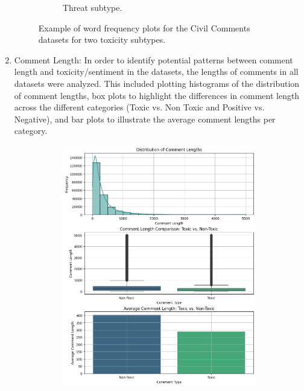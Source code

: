 \documentclass[10pt,a4paper,oneside]{article} %
\begin{document}
\begin{enumerate}
\begin{figure}[h]
\begin{subfigure}{0.5\textwidth}
        \caption{Threat subtype.}
        \label{fig:word_freq_threat_cc}
    \end{subfigure}
    \caption{Example of word frequency plots for the Civil Comments datasets for two toxicity subtypes.}
    \label{fig:word_freq_cc}
    \end{figure}
    \item Comment Length: In order to identify potential patterns between comment length and toxicity/sentiment in the datasets, the lengths of comments in all datasets were analyzed. This included plotting histograms of the distribution of comment lengths, box plots to highlight the differences in comment length across the different categories (Toxic vs. Non Toxic and Positive vs. Negative), and bar plots to illustrate the average comment lengths per category. 
    \begin{figure}[h]
    \centering
    \begin{subfigure}{0.5\textwidth}
        \centering
        \includegraphics[width=\textwidth, clip, trim=0 240 0 730]{replibert/replibert/plots/comment_len_jigsaw.png}

\end{subfigure}
\end{figure}
\end{enumerate}
\end{document}
